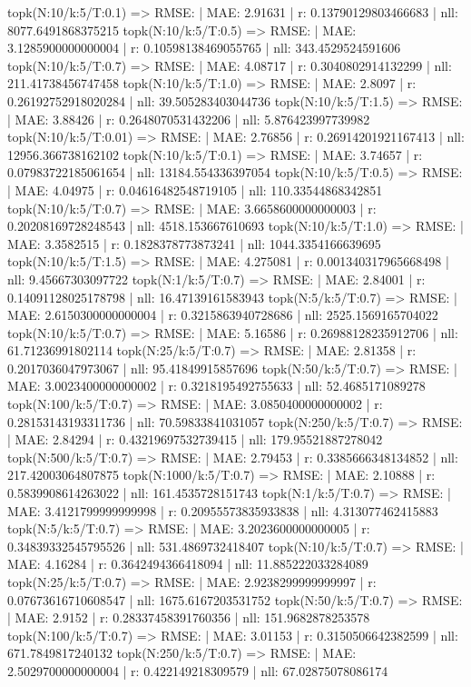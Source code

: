 topk(N:10/k:5/T:0.1) => RMSE: | MAE: 2.91631 | r: 0.13790129803466683 | nll: 8077.6491868375215
topk(N:10/k:5/T:0.5) => RMSE: | MAE: 3.1285900000000004 | r: 0.10598138469055765 | nll: 343.4529524591606
topk(N:10/k:5/T:0.7) => RMSE: | MAE: 4.08717 | r: 0.3040802914132299 | nll: 211.41738456747458
topk(N:10/k:5/T:1.0) => RMSE: | MAE: 2.8097 | r: 0.26192752918020284 | nll: 39.505283403044736
topk(N:10/k:5/T:1.5) => RMSE: | MAE: 3.88426 | r: 0.2648070531432206 | nll: 5.876423997739982
topk(N:10/k:5/T:0.01) => RMSE: | MAE: 2.76856 | r: 0.26914201921167413 | nll: 12956.366738162102
topk(N:10/k:5/T:0.1) => RMSE: | MAE: 3.74657 | r: 0.07983722185061654 | nll: 13184.554336397054
topk(N:10/k:5/T:0.5) => RMSE: | MAE: 4.04975 | r: 0.04616482548719105 | nll: 110.33544868342851
topk(N:10/k:5/T:0.7) => RMSE: | MAE: 3.6658600000000003 | r: 0.20208169728248543 | nll: 4518.153667610693
topk(N:10/k:5/T:1.0) => RMSE: | MAE: 3.3582515 | r: 0.1828378773873241 | nll: 1044.3354166639695
topk(N:10/k:5/T:1.5) => RMSE: | MAE: 4.275081 | r: 0.001340317965668498 | nll: 9.45667303097722
topk(N:1/k:5/T:0.7) => RMSE: | MAE: 2.84001 | r: 0.14091128025178798 | nll: 16.47139161583943
topk(N:5/k:5/T:0.7) => RMSE: | MAE: 2.6150300000000004 | r: 0.3215863940728686 | nll: 2525.1569165704022
topk(N:10/k:5/T:0.7) => RMSE: | MAE: 5.16586 | r: 0.26988128235912706 | nll: 61.71236991802114
topk(N:25/k:5/T:0.7) => RMSE: | MAE: 2.81358 | r: 0.2017036047973067 | nll: 95.41849915857696
topk(N:50/k:5/T:0.7) => RMSE: | MAE: 3.0023400000000002 | r: 0.3218195492755633 | nll: 52.4685171089278
topk(N:100/k:5/T:0.7) => RMSE: | MAE: 3.0850400000000002 | r: 0.28153143193311736 | nll: 70.59833841031057
topk(N:250/k:5/T:0.7) => RMSE: | MAE: 2.84294 | r: 0.43219697532739415 | nll: 179.95521887278042
topk(N:500/k:5/T:0.7) => RMSE: | MAE: 2.79453 | r: 0.3385666348134852 | nll: 217.42003064807875
topk(N:1000/k:5/T:0.7) => RMSE: | MAE: 2.10888 | r: 0.5839908614263022 | nll: 161.4535728151743
topk(N:1/k:5/T:0.7) => RMSE: | MAE: 3.4121799999999998 | r: 0.20955573835933838 | nll: 4.313077462415883
topk(N:5/k:5/T:0.7) => RMSE: | MAE: 3.2023600000000005 | r: 0.34839332545795526 | nll: 531.4869732418407
topk(N:10/k:5/T:0.7) => RMSE: | MAE: 4.16284 | r: 0.3642494366418094 | nll: 11.885222033284089
topk(N:25/k:5/T:0.7) => RMSE: | MAE: 2.9238299999999997 | r: 0.07673616710608547 | nll: 1675.6167203531752
topk(N:50/k:5/T:0.7) => RMSE: | MAE: 2.9152 | r: 0.28337458391760356 | nll: 151.9682878253578
topk(N:100/k:5/T:0.7) => RMSE: | MAE: 3.01153 | r: 0.3150506642382599 | nll: 671.7849817240132
topk(N:250/k:5/T:0.7) => RMSE: | MAE: 2.5029700000000004 | r: 0.422149218309579 | nll: 67.02875078086174
